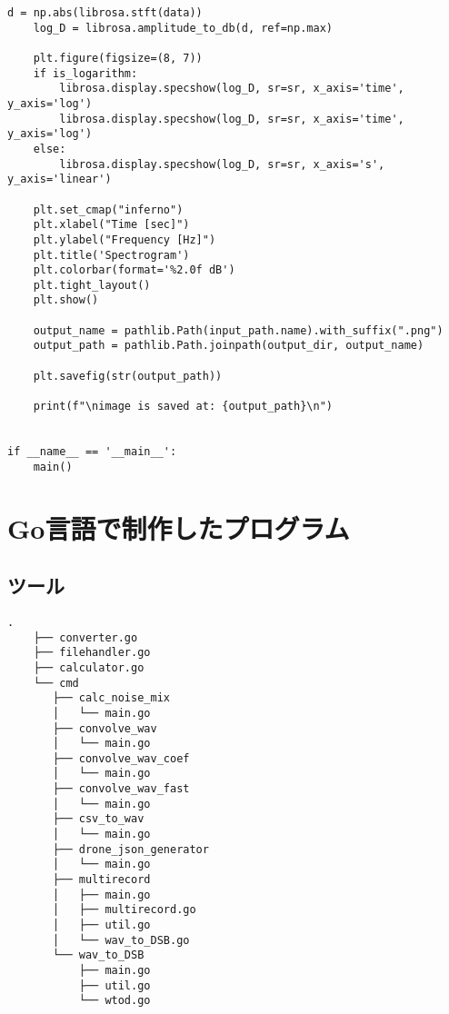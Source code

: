 \begin{lstlisting}[caption=plot\_spectrogram\_librosa.py,label=plot\_spectrogram\_librosa.py]
    d = np.abs(librosa.stft(data))
    log_D = librosa.amplitude_to_db(d, ref=np.max)

    plt.figure(figsize=(8, 7))
    if is_logarithm:
        librosa.display.specshow(log_D, sr=sr, x_axis='time', y_axis='log')
        librosa.display.specshow(log_D, sr=sr, x_axis='time', y_axis='log')
    else:
        librosa.display.specshow(log_D, sr=sr, x_axis='s', y_axis='linear')

    plt.set_cmap("inferno")
    plt.xlabel("Time [sec]")
    plt.ylabel("Frequency [Hz]")
    plt.title('Spectrogram')
    plt.colorbar(format='%2.0f dB')
    plt.tight_layout()
    plt.show()

    output_name = pathlib.Path(input_path.name).with_suffix(".png")
    output_path = pathlib.Path.joinpath(output_dir, output_name)

    plt.savefig(str(output_path))

    print(f"\nimage is saved at: {output_path}\n")


if __name__ == '__main__':
    main()
\end{lstlisting}


\section{Go言語で制作したプログラム}



\subsection{ツール}

\begin{lstlisting}[caption=ディレクトリ構成,label=ディレクトリ構成]
    .
    ├── converter.go
    ├── filehandler.go
    ├── calculator.go
    └── cmd
       ├── calc_noise_mix
       │   └── main.go
       ├── convolve_wav
       │   └── main.go
       ├── convolve_wav_coef
       │   └── main.go
       ├── convolve_wav_fast
       │   └── main.go
       ├── csv_to_wav
       │   └── main.go
       ├── drone_json_generator
       │   └── main.go
       ├── multirecord
       │   ├── main.go
       │   ├── multirecord.go
       │   ├── util.go
       │   └── wav_to_DSB.go
       └── wav_to_DSB
           ├── main.go
           ├── util.go
           └── wtod.go
\end{lstlisting}

